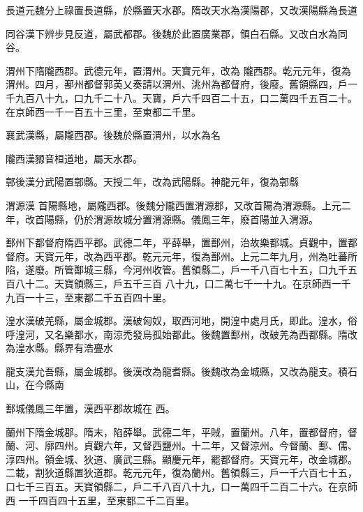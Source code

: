 \begin{pinyinscope}
 長道元魏分上祿置長道縣，於縣置天水郡。隋改天水為漢陽郡，又改漢陽縣為長道



 同谷漢下辨步見反道，屬武都郡。後魏於此置廣業郡，領白石縣。又改白水為同谷。



 渭州下隋隴西郡。武德元年，置渭州。天寶元年，改為
 隴西郡。乾元元年，復為渭州。四月，鄯州都督郭英乂奏請以渭州、洮州為都督府，後廢。舊領縣四，戶一千九百八十九，口九千二十八。天寶，戶六千四百二十五，口二萬四千五百二十。在京師西一千一百五十三里，至東都二千里。



 襄武漢縣，屬隴西郡。後魏於縣置渭州，以水為名



 隴西漢豲音桓道地，屬天水郡。



 鄣後漢分武陽置鄣縣。天授二年，改為武陽縣。神龍元年，復為鄣縣



 渭源漢
 首陽縣地，屬隴西郡。後魏分隴西置渭源郡，又改首陽為渭源縣。上元二年，改首陽縣，仍於渭源故城分置渭源縣。儀鳳三年，廢首陽並入渭源。



 鄯州下都督府隋西平郡。武德二年，平薛舉，置鄯州，治故樂都城。貞觀中，置都督府。天寶元年，改為西平郡。乾元元年，復為鄯州。上元二年九月，州為吐蕃所陷，遂廢。所管鄯城三縣，今河州收管。舊領縣二，戶一千八百七十五，口九千五百八十二。天寶領縣三，戶五千三百
 八十九，口二萬七千一十九。在京師西一千九百一十三，至東都二千五百四十里。



 湟水漢破羌縣，屬金城郡。漢破匈奴，取西河地，開湟中處月氏，即此。湟水，俗呼湟河，又名樂都水，南涼禿發烏孤始都此。後魏置鄯州，改破羌為西都縣。隋改為湟水縣。縣界有浩亹水



 龍支漢允吾縣，屬金城郡。後漢改為龍耆縣。後魏改為金城縣，又改為龍支。積石山，在今縣南



 鄯城儀鳳三年置，漢西平郡故城在
 西。



 蘭州下隋金城郡。隋末，陷薛舉。武德二年，平賊，置蘭州。八年，置都督府，督蘭、河、廓四州。貞觀六年，又督西鹽州。十二年，又督涼州。今督蘭、鄯、儒、淳四州。領金城、狄道、廣武三縣。顯慶元年，罷都督府。天寶元年，改金城郡。二載，割狄道縣置狄道郡。乾元元年，復為蘭州。舊領縣三，戶一千六百七十五，口七千三百五。天寶領縣二，戶二千八百八十九，口一萬四千二百二十六。在京師西
 一千四百四十五里，至東都二千二百里。




\end{pinyinscope}

